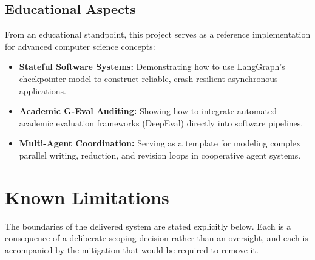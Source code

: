 \subsection{Educational Aspects}
From an educational standpoint, this project serves as a reference implementation for advanced computer science concepts:
\begin{itemize}
    \item \textbf{Stateful Software Systems:} Demonstrating how to use LangGraph's checkpointer model to construct reliable, crash-resilient asynchronous applications.
    \item \textbf{Academic G-Eval Auditing:} Showing how to integrate automated academic evaluation frameworks (DeepEval) directly into software pipelines.
    \item \textbf{Multi-Agent Coordination:} Serving as a template for modeling complex parallel writing, reduction, and revision loops in cooperative agent systems.
\end{itemize}

\section{Known Limitations}

The boundaries of the delivered system are stated explicitly below. Each is a
consequence of a deliberate scoping decision rather than an oversight, and each
is accompanied by the mitigation that would be required to remove it.

